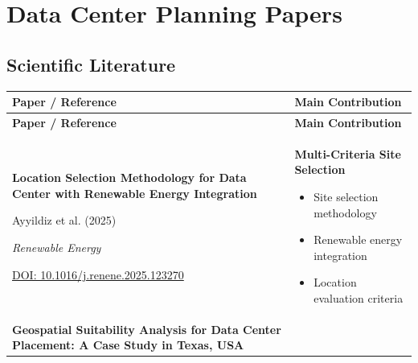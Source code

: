 
\chapter{Data Center Planning Papers}
\label{chap:datacenter_papers}

\section{Scientific Literature}

\renewcommand{\arraystretch}{1.5}
\setlength{\tabcolsep}{5pt}
\small

\begin{longtable}{
    |p{8cm}|p{7cm}|
}

\hline
\rowcolor{header}
\color{white}\textbf{Paper / Reference} &
\color{white}\textbf{Main Contribution} \\ \hline
\endfirsthead

\hline
\rowcolor{header}
\color{white}\textbf{Paper / Reference} &
\color{white}\textbf{Main Contribution} \\ \hline
\endhead

\rowcolor{green!8}
\textbf{Location Selection Methodology for Data Center
with Renewable Energy Integration}

Ayyildiz et al. (2025)

\textit{Renewable Energy}

\href{https://doi.org/10.1016/j.renene.2025.123270}
{DOI: 10.1016/j.renene.2025.123270}
&
\textbf{Multi-Criteria Site Selection}
\begin{itemize}
    \setlength{\itemsep}{0pt}
    \setlength{\topsep}{0pt}
    \item Site selection methodology
    \item Renewable energy integration
    \item Location evaluation criteria
\end{itemize}
\\ \hline


\rowcolor{green!8}
\textbf{Geospatial Suitability Analysis for Data
Center Placement: A Case Study in Texas, USA}


\end{longtable}
